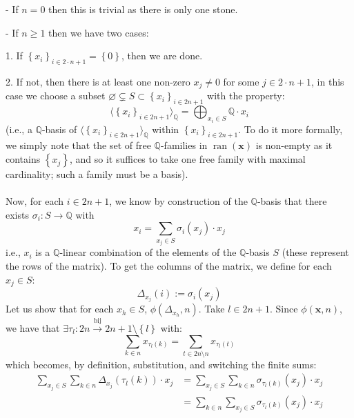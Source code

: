 \begin{solution}
    - If \( n = 0 \) then this is trivial as there is only one stone.

    - If \( n \geq 1 \) then we have two cases:

    1. If \( \left\{x_i\right\}_{i \in 2 \cdot n + 1} = \left\{0\right\} \), then we are done.

    2. If not, then there is at least one non-zero \( x_j \neq 0 \) for some \( j \in 2 \cdot n + 1 \), in this case we choose a subset \( \varnothing\subsetneq S \subset \left\{x_i\right\}_{i \in 2n + 1} \) with the property:
    \[
        \langle \left\{x_i\right\}_{i \in 2n + 1} \rangle_{\mathbb{Q}} = \bigoplus_{x_i \in S} \mathbb{Q} \cdot x_i
    \]
    (i.e., a \( \mathbb{Q} \)-basis of \( \langle \left\{x_i\right\}_{i \in 2n + 1} \rangle_{\mathbb{Q}} \) within \( \left\{x_i\right\}_{i \in 2n + 1} \). To do it more formally, we simply note that the set of free \( \mathbb{Q} \)-families in \( \operatorname{ran}\left(\textbf{x}\right) \) is non-empty as it contains \( \left\{x_j\right\} \), and so it suffices to take one free family with maximal cardinality; such a family must be a basis).
    \\\\
    Now, for each \( i \in 2n + 1 \), we know by construction of the \( \mathbb{Q} \)-basis that there exists \( \sigma_i: S \rightarrow \mathbb{Q} \) with
    \[
        x_i = \sum_{x_j \in S} \sigma_i\left(x_j\right) \cdot x_j
    \]
    i.e., \( x_i \) is a \( \mathbb{Q} \)-linear combination of the elements of the \( \mathbb{Q} \)-basis \( S \) (these represent the rows of the matrix). To get the columns of the matrix, we define for each \( x_j \in S \):
    \[
        \Delta_{x_{j}}\left(i\right) := \sigma_i\left(x_j\right)
    \]
    Let us show that for each \( x_h \in S \), \( \phi\left(\Delta_{x_{h}}, n\right) \). Take \( l \in 2n + 1 \). Since \( \phi\left(\textbf{x}, n\right) \), we have that \( \exists \tau_l : 2n \overset{\text{bij}}{\rightarrow} 2n + 1 \setminus \left\{l\right\} \) with:
    \[
        \sum_{k \in n} x_{\tau_l\left(k\right)} = \sum_{t \in 2n \setminus n} x_{\tau_l\left(t\right)}
    \]
    which becomes, by definition, substitution, and switching the finite sums:
    \begin{align*}
        \sum_{x_j \in S} \sum_{k \in n} \Delta_{x_{j}}(\tau_{l}(k)) \cdot x_j &= \sum_{x_j \in S} \sum_{k \in n} \sigma_{\tau_{l}(k)}(x_j) \cdot x_j \\
        &= \sum_{k \in n} \sum_{x_j \in S} \sigma_{\tau_{l}(k)}(x_j) \cdot x_j \\

\end{align*}
\end{solution}
